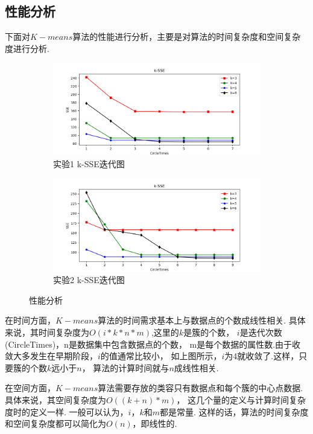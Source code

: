 \documentclass[bachelor,adobefonts]{jnuthesis}
\begin{document}
\subsection{性能分析}
下面对$K-means$算法的性能进行分析，主要是对算法的时间复杂度和空间复杂度进行分析.
\begin{figure}[h!]
  \centering
  \begin{subfigure}[b]{0.8\linewidth}
    \includegraphics[width=\linewidth]{Wct-SSE-first.png}
    \caption{实验1 k-SSE迭代图}
  \end{subfigure}
  \begin{subfigure}[b]{0.8\linewidth}
    \includegraphics[width=\linewidth]{Wct-SSE-second.png}
    \caption{实验2 k-SSE迭代图}
  \end{subfigure}
  \caption{性能分析}
\end{figure}

在时间方面，$K-means$算法的时间需求基本上与数据点的个数成线性相关.
具体来说，其时间复杂度为$O(i*k*n*m)$,这里的$k$是簇的个数，
$i$是迭代次数(CircleTimes)，n是数据集中包含数据点的个数，
m是每个数据的属性数.由于收敛大多发生在早期阶段，$i$的值通常比较小，
如上图所示，$i$为4就收敛了.这样，只要簇的个数$k$远小于$n$，
算法的计算时间就与$n$成线性相关.

在空间方面，$K-means$算法需要存放的类容只有数据点和每个簇的中心点数据.
具体来说，其空间复杂度为$O((k+n)*m)$，
这几个量的定义与计算时间复杂度时的定义一样.
一般可以认为，$i$，$k$和$m$都是常量.
这样的话，算法的时间复杂度和空间复杂度都可以简化为$O(n)$，即线性的.
\end{document}
